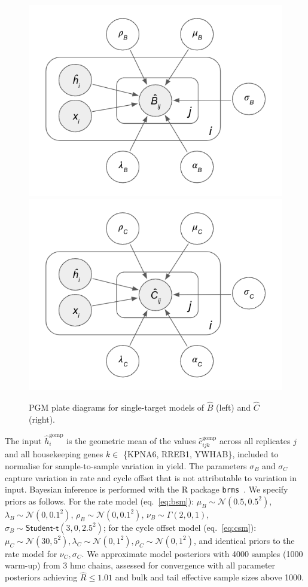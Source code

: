 \documentclass[../thesis.tex]{subfiles}
\begin{document}
\begin{figure}
    \centering
    \includegraphics[width=.45\textwidth]{figures/chapter2/LAMP_STM_B_PGM.png} \includegraphics[width=.45\textwidth]{figures/chapter2/LAMP_STM_C_PGM.png}
    \caption{PGM plate diagrams for single-target models of $\hat{B}$ (left) and $\hat{C}$ (right).}
    \label{fig:stm_pgms}
\end{figure}
The input $\hat{h}^{\text{gomp}}_{i}$ is the geometric mean of the values $\hat{c}_{ijk}^{\text{gomp}}$ across all replicates $j$ and all housekeeping genes  $k \in$ \{KPNA6, RREB1, YWHAB\}, included to normalise for sample-to-sample variation in  yield. The parameters $\sigma_B$ and $\sigma_C$ capture variation in rate and cycle offset that is not attributable to variation in  input. Bayesian inference is performed with the R package \texttt{brms}~\citep{burkner_brms_2017}. We specify priors as follows. For the rate model (eq.~\ref{eq:bsm}): $\mu_B \sim \mathcal{N}(0.5, 0.5^2)$, $\lambda_B \sim \mathcal{N}(0, 0.1^2)$, $\rho_B \sim \mathcal{N}(0, 0.1^2)$, $\nu_B \sim \Gamma(2,0,1)$, $\sigma_B \sim \textsf{Student-t}(3, 0, 2.5^2)$; for the cycle offset model (eq.~\ref{eq:csm}): $\mu_C \sim \mathcal{N}(30, 5^2), \lambda_C \sim \mathcal{N}(0, 1^2), \rho_C \sim \mathcal{N}(0, 1^2)$, and identical priors to the rate model for $\nu_C,\sigma_C$. We approximate model posteriors with 4000 samples (1000 warm-up) from 3 \gls{hmc} chains, assessed for convergence with all parameter posteriors achieving $\hat{R} \leq 1.01$ and bulk and tail effective sample sizes above 1000.
\end{document}
